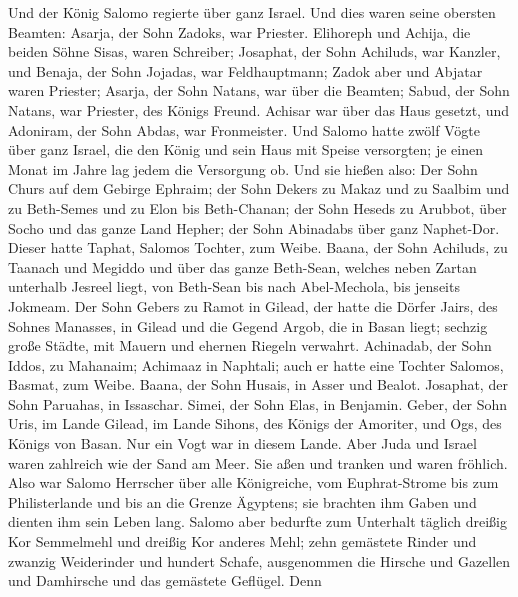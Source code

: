  Und der König Salomo regierte über ganz Israel. Und dies
waren seine obersten Beamten:  Asarja, der Sohn Zadoks,
war Priester.  Elihoreph und Achija, die beiden Söhne
Sisas, waren Schreiber; Josaphat, der Sohn Achiluds, war Kanzler,
 und Benaja, der Sohn Jojadas, war Feldhauptmann; Zadok
aber und Abjatar waren Priester;  Asarja, der Sohn Natans,
war über die Beamten; Sabud, der Sohn Natans, war Priester, des Königs
Freund.  Achisar war über das Haus gesetzt, und Adoniram,
der Sohn Abdas, war Fronmeister.  Und Salomo hatte zwölf
Vögte über ganz Israel, die den König und sein Haus mit Speise
versorgten; je einen Monat im Jahre lag jedem die Versorgung ob.
 Und sie hießen also: Der Sohn Churs auf dem Gebirge
Ephraim;  der Sohn Dekers zu Makaz und zu Saalbim und zu
Beth-Semes und zu Elon bis Beth-Chanan;  der Sohn Heseds
zu Arubbot, über Socho und das ganze Land Hepher;  der
Sohn Abinadabs über ganz Naphet-Dor. Dieser hatte Taphat, Salomos
Tochter, zum Weibe.  Baana, der Sohn Achiluds, zu Taanach
und Megiddo und über das ganze Beth-Sean, welches neben Zartan unterhalb
Jesreel liegt, von Beth-Sean bis nach Abel-Mechola, bis jenseits
Jokmeam.  Der Sohn Gebers zu Ramot in Gilead, der hatte
die Dörfer Jairs, des Sohnes Manasses, in Gilead und die Gegend Argob,
die in Basan liegt; sechzig große Städte, mit Mauern und ehernen Riegeln
verwahrt.  Achinadab, der Sohn Iddos, zu Mahanaim;
Achimaaz in Naphtali;  auch er hatte eine Tochter
Salomos, Basmat, zum Weibe.  Baana, der Sohn Husais, in
Asser und Bealot.  Josaphat, der Sohn Paruahas, in
Issaschar.  Simei, der Sohn Elas, in Benjamin.
 Geber, der Sohn Uris, im Lande Gilead, im Lande Sihons,
des Königs der Amoriter, und Ogs, des Königs von Basan. Nur ein Vogt war
in diesem Lande.  Aber Juda und Israel waren zahlreich
wie der Sand am Meer. Sie aßen und tranken und waren fröhlich.
 Also war Salomo Herrscher über alle Königreiche, vom
Euphrat-Strome bis zum Philisterlande und bis an die Grenze Ägyptens;
sie brachten ihm Gaben und dienten ihm sein Leben lang. 
Salomo aber bedurfte zum Unterhalt täglich dreißig Kor Semmelmehl und
dreißig Kor anderes Mehl;  zehn gemästete Rinder und
zwanzig Weiderinder und hundert Schafe, ausgenommen die Hirsche und
Gazellen und Damhirsche und das gemästete Geflügel.  Denn
